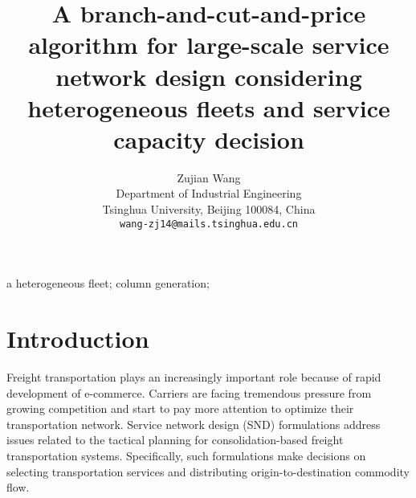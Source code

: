 \documentclass[11pt,nonblindrev,fleqn]{article}
\newcommand{\singlespace}{\renewcommand{\baselinestretch}{1}\small\normalsize}
\newcommand{\doublespace}{\renewcommand{\baselinestretch}{1.5}\small\normalsize}
\begin{document}
\singlespace

\begin{titlepage}
\title{A branch-and-cut-and-price algorithm for large-scale service network design considering heterogeneous fleets and service capacity decision}
\author{
	Zujian Wang \\
	\small{Department of Industrial Engineering} \\
	\small{Tsinghua University, Beijing 100084, China} \\
	\small{\tt wang-zj14@mails.tsinghua.edu.cn} \\
	}
\date{} %
\end{titlepage}
\maketitle



\vspace{.25in}

 a heterogeneous fleet; column generation;





\doublespace
\section{Introduction}\label{Section_Intro}
Freight transportation plays an increasingly important role because of rapid development of e-commerce. Carriers are facing tremendous pressure from growing competition and start to pay more attention to optimize their transportation network. Service network design (SND) formulations address issues related to the tactical planning for consolidation-based freight transportation systems. Specifically, such formulations make decisions on selecting transportation services and distributing origin-to-destination commodity flow.
\end{document}

